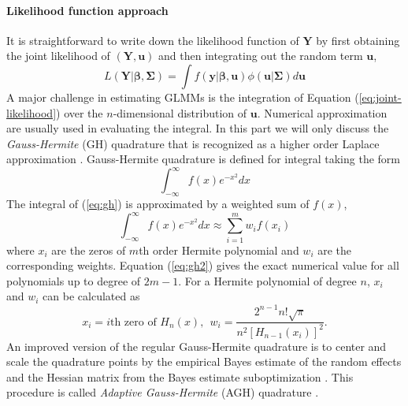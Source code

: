 		\paragraph{Likelihood function approach}
		It is straightforward  to write down the likelihood function of $\bm Y$ by first obtaining the joint likelihood of $(\bm Y, \bm u)$ and then integrating out the random term $\bm u$,
		\begin{equation}\label{eq:joint-likelihood}
		L(\bm Y|\bm\beta, \bm \Sigma) = \int f(\bm y|\bm \beta, \bm u)\phi(\bm u|\bm \Sigma)d \bm u
		\end{equation}
		A major challenge in estimating GLMMs is the integration of Equation (\ref{eq:joint-likelihood}) over the $n$-dimensional distribution of $\bm u$. Numerical approximation are usually used in evaluating the integral. In this part we will only discuss the \textit{Gauss-Hermite} (GH) quadrature that is recognized as a higher order Laplace approximation \citep{liu1994note}.
		Gauss-Hermite quadrature is defined for integral taking the form 
		\begin{equation}\label{eq:gh}
		\int_{-\infty}^{\infty}f(x) e^{-x^2}dx
		\end{equation}
		The integral of (\ref{eq:gh}) is approximated by a weighted sum of  $f(x)$, 
		\begin{equation}\label{eq:gh2}
		\int_{-\infty}^{\infty}f(x) e^{-x^2}dx \approx \sum_{i=1}^m w_if(x_i)
		\end{equation}
		where $x_i$ are the zeros of $m$th order Hermite polynomial and $w_i$ are the corresponding weights. Equation (\ref{eq:gh2}) gives the exact numerical value for all polynomials up to degree of $2m-1$. For a Hermite polynomial of degree $n$, $x_i$ and $w_i$ can be calculated as 	
		\begin{equation}\label{eq:gh3}
		x_i = i\text{th zero of } H_n(x),~~  w_i = \frac{2^{n-1}n!\sqrt{\pi}}{n^2[H_{n-1}(x_i)]^2}. 
		\end{equation}
		An improved version of the regular Gauss-Hermite quadrature is to center and scale the quadrature points  by the empirical Bayes estimate of the random effects and the Hessian matrix from the Bayes estimate suboptimization \citep{liu1994note}. This procedure is called \textit{Adaptive Gauss-Hermite} (AGH) quadrature \citep{pinheiro1995approximations}. %
		
